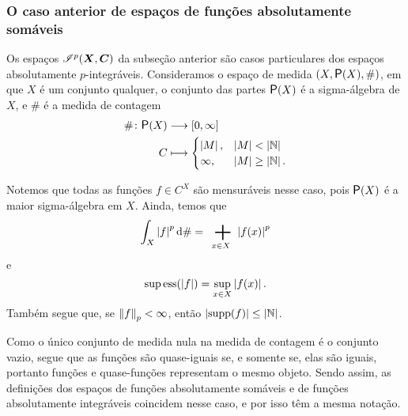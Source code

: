 \subsubsection{O caso anterior de espaços de funções absolutamente somáveis}

Os espaços $\mathscr{I}^p(\bm X,\bm C)$ da subseção anterior são casos particulares dos espaços absolutamente $p$-integráveis. Consideramos o espaço de medida $(X,\p(X),\#)$, em que $X$ é um conjunto qualquer, o conjunto das partes $\p(X)$ é a sigma-álgebra de $X$, e $\#$ é a medida de contagem
	\begin{align*}
	\func{\#}{\p(X)}{\intff{0}{\infty}}{C}{
		\begin{cases}
			\card{M},& \card{M}<\card{\N} \\
			\infty,& \card{M} \geq \card{\N}.
		\end{cases}
	}
	\end{align*}

Notemos que todas as funções $f \in C^X$ são mensuráveis nesse caso, pois $\p(X)$ é a maior sigma-álgebra em $X$.
Ainda, temos que
	\begin{equation*}
	\int_X \abs{f}^p \dd\# = \sum_{x \in X} \abs{f(x)}^p
	\end{equation*}
e
	\begin{equation*}
	\operatorname{sup\,ess}(\left\vert{f}\right\vert) = \sup_{x \in X} \left\vert{f(x)}\right\vert.
	\end{equation*}
Também segue que, se $\left\Vert{f}\right\Vert_p < \infty$, então $\left\lvert{\operatorname{supp}(f)}\right\rvert \leq \left\lvert{\mathbb{N}}\right\rvert$. 

Como o único conjunto de medida nula na medida de contagem é o conjunto vazio, segue que as funções são quase-iguais se, e somente se, elas são iguais, portanto funções e quase-funções representam o mesmo objeto. Sendo assim, as definições dos espaços de funções absolutamente somáveis e de funções absolutamente integráveis coincidem nesse caso, e por isso têm a mesma notação.


